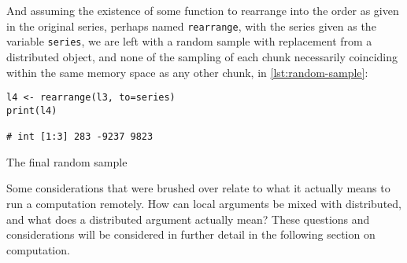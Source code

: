 And assuming the existence of some function to rearrange into the order
as given in the original series, perhaps named \texttt{rearrange}, with
the series given as the variable \texttt{series}, we are left with a
random sample with replacement from a distributed object, and none of
the sampling of each chunk necessarily coinciding within the same memory
space as any other chunk, in \cref{lst:random-sample}:

\begin{listing}
    \begin{verbatim}
l4 <- rearrange(l3, to=series)
print(l4)

# int [1:3] 283 -9237 9823
    \end{verbatim}
    \caption{The final random sample}
    \label{lst:random-sample}
\end{listing}

Some considerations that were brushed over relate to what it actually
means to run a computation remotely. How can local arguments be mixed
with distributed, and what does a distributed argument actually mean?
These questions and considerations will be considered in further detail
in the following section on computation.